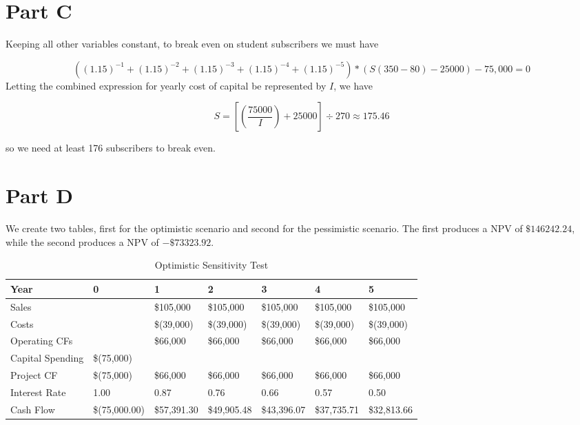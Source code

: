 \documentclass[12pt, letterpaper, parskip = full]{article}
\begin{document}
\section{Part C}

Keeping all other variables constant, to break even on student subscribers we must have

\[ \left( (1.15)^{-1} + (1.15)^{-2} + (1.15)^{-3} + (1.15)^{-4} + (1.15)^{-5} \right) * ( S (350 - 80) - 25000 ) - 75,000 = 0     \]
Letting the combined expression for yearly cost of capital be represented by \(I\), we have

\[ S = \left[\left(\frac{75000}{I}\right) + 25000\right] \div 270 \approx 175.46   \]

so we need at least 176 subscribers to break even.

\section{Part D}

We create two tables, first for the optimistic scenario and second for the pessimistic scenario. The first produces a NPV of \(\$146242.24\), while the second produces a NPV of \(-\$73323.92\). 

\begin{table}[!ht]
    \centering
    \caption{Optimistic Sensitivity Test}
    \begin{tabularx}{\textwidth}{|X|X|X|X|X|X|X|}
    \hline
        Year & 0 & 1 & 2 & 3 & 4 & 5 \\ \hline
        Sales & ~ &  \$105,000  &  \$105,000  &  \$105,000  &  \$105,000  &  \$105,000  \\ \hline
        Costs & ~ &  \$(39,000) &  \$(39,000) &  \$(39,000) &  \$(39,000) &  \$(39,000) \\ \hline
        Operating CFs & ~ &  \$66,000  &  \$66,000  &  \$66,000  &  \$66,000  &  \$66,000  \\ \hline
        Capital Spending &  \$(75,000) & ~ & ~ & ~ & ~ & ~ \\ \hline
        Project CF &  \$(75,000) &  \$66,000  &  \$66,000  &  \$66,000  &  \$66,000  &  \$66,000  \\ \hline
        Interest Rate &  1.00  &  0.87  &  0.76  &  0.66  &  0.57  &  0.50  \\ \hline
        Cash Flow &  \$(75,000.00) &  \$57,391.30  &  \$49,905.48  &  \$43,396.07  &  \$37,735.71  &  \$32,813.66 \\ \hline
    \end{tabularx}
\end{table}
\end{document}
